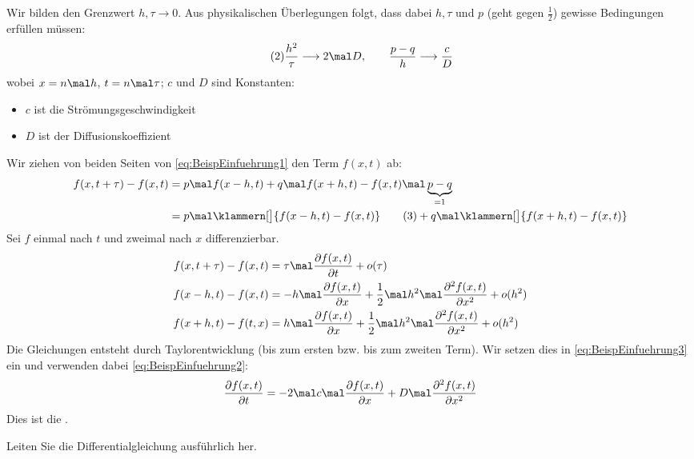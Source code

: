 \begin{beisp}
	Wir bilden den Grenzwert $h,\tau\longrightarrow 0$.
	Aus physikalischen Überlegungen folgt, dass dabei $h,\tau$ und $p$ (geht gegen $\frac{1}{2}$) gewisse Bedingungen erfüllen müssen:
	\begin{align}\label{eq:BeispEinfuehrung2}\tag{2}
		\frac{h^2}{\tau}\longrightarrow 2\mal D,\qquad
		\frac{p-q}{h}\longrightarrow\frac{c}{D}
	\end{align}
	wobei $x=n\mal h$, $t=n\mal\tau$; $c$ und $D$ sind Konstanten:
	\begin{itemize}
		\item $c$ ist die Strömungsgeschwindigkeit
		\item $D$ ist der Diffusionskoeffizient
	\end{itemize}
	Wir ziehen von beiden Seiten von \eqref{eq:BeispEinfuehrung1} den Term $f(x,t)$ ab:
	\begin{align}
			f(x,t+\tau)-f(x,t)\nonumber
			&=p\mal f(x-h,t)+q\mal f(x+h,t)-f(x,t)\mal\underbrace{p-q}_{=1}\\
			&=p\mal\klammern[\big]{f(x-h,t)-f(x,t)}\label{eq:BeispEinfuehrung3}\tag{3}
			+q\mal\klammern[\big]{f(x+h,t)-f(x,t)}
	\end{align}
	Sei $f$ einmal nach $t$ und zweimal nach $x$ differenzierbar.
	\begin{align*}
		f(x,t+\tau)-f(x,t)
		&=\tau\mal\frac{\partial f(x,t)}{\partial t}+o(\tau)\\
		f(x-h,t)-f(x,t)
		&=-h\mal\frac{\partial f(x,t)}{\partial x}
		+\frac{1}{2}\mal h^2\mal\frac{\partial^2 f(x,t)}{\partial x^2}+o(h^2)\\
		f(x+h,t)-f(t,x)
		&=h\mal\frac{\partial f(x,t)}{\partial x}+\frac{1}{2}\mal h^2\mal\frac{\partial^2 f(x,t)}{\partial x^2}+o(h^2)
	\end{align*}
	Die Gleichungen entsteht durch Taylorentwicklung (bis zum ersten bzw. bis zum zweiten Term).
	Wir setzen dies in \eqref{eq:BeispEinfuehrung3} ein und verwenden dabei \eqref{eq:BeispEinfuehrung2}:
	\begin{align*}
		\frac{\partial f(x,t)}{\partial t}
		=-2\mal c\mal\frac{\partial f(x,t)}{\partial x}+D\mal\frac{\partial^2 f(x,t)}{\partial x^2}
	\end{align*}
	Dies ist die .
	\begin{aufgabenr}\label{aufg:2}\enter
		Leiten Sie die Differentialgleichung ausführlich her.
	\end{aufgabenr}
\end{beisp}

